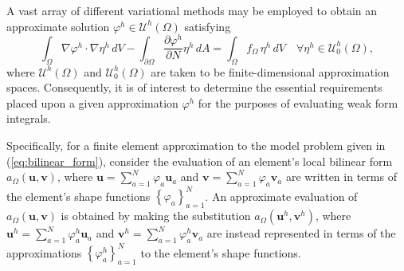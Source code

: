 	A vast array of different variational methods may be employed to obtain an approximate solution $\varphi^h \in \mathcal{U}^h (\Omega)$ satisfying
	\begin{equation}
		\int_\Omega \nabla \varphi^h \cdot \nabla \eta^h \, dV - \int_{\partial \Omega} \frac{\partial \varphi^h}{\partial N} \eta^h \, dA = \int_\Omega f_{\Omega} \, \eta^h \, dV \quad \forall \eta^h \in \mathcal{U}^h_0 (\Omega),
		\label{eq:approximate_bvp}
	\end{equation}
	where $\mathcal{U}^h (\Omega)$ and $\mathcal{U}^h_0 (\Omega)$ are taken to be finite-dimensional approximation spaces. Consequently, it is of interest to determine the essential requirements placed upon a given approximation $\varphi^h$ for the purposes of evaluating weak form integrals.
	
	Specifically, for a finite element approximation to the model problem given in (\ref{eq:bilinear_form}), consider the evaluation of an element's local bilinear form $a_{\Omega}(\mathbf{u},\mathbf{v})$, where $\mathbf{u} = \sum_{a=1}^N \varphi_a \mathbf{u}_a$ and $\mathbf{v} = \sum_{a=1}^N \varphi_a \mathbf{v}_a$ are written in terms of the element's shape functions $\left\{ \varphi_a \right\}_{a=1}^N$. An approximate evaluation of $a_{\Omega}(\mathbf{u},\mathbf{v})$ is obtained by making the substitution $a_{\Omega}(\mathbf{u}^h,\mathbf{v}^h)$, where $\mathbf{u}^h = \sum_{a=1}^N \varphi^h_a \mathbf{u}_a$ and $\mathbf{v}^h = \sum_{a=1}^N \varphi^h_a \mathbf{v}_a$ are instead represented in terms of the approximations $\left\{ \varphi^h_a \right\}_{a=1}^N$ to the element's shape functions.
	
